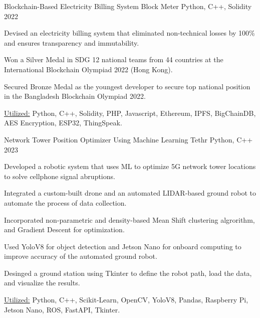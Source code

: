 

\begin{cventries}
      
  \cventryprojects
  {Blockchain-Based Electricity Billing System } %
  {Block Meter} %
  {Python, C++, Solidity} %
  {2022} %
  {
    \begin{cvitems} %
      \item {Devised an electricity billing system that eliminated non-technical losses by 100\% and ensures transparency and immutability.}
      \item {Won a Silver Medal in SDG 12 national teams from 44 countries at the International Blockchain Olympiad 2022 (Hong Kong).}
      \item {Secured Bronze Medal as the youngest developer to secure top national position in the Bangladesh Blockchain Olympiad 2022.}
      \item {\underline{Utilized:} Python, C++, Solidity, PHP, Javascript, Ethereum, IPFS, BigChainDB, AES Encryption, ESP32, ThingSpeak.}
    \end{cvitems}
    }
          
  \cventryprojects
    {Network Tower Position Optimizer Using Machine Learning} %
    {Tethr} %
    {Python, C++} %
    {2023} %
    {
      \begin{cvitems} %
        \item {Developed a robotic system that uses ML to optimize 5G network tower locations 
        to solve cellphone signal abruptions.}
        \item {Integrated a custom-built drone and an automated LIDAR-based ground robot to automate the process of 
        data collection.}
        \item {Incorporated non-parametric and density-based Mean Shift clustering algrorithm, and Gradient Descent 
        for optimization.}
        \item {Used YoloV8 for object detection and Jetson Nano for onboard computing to improve accuracy of the automated 
        ground robot.}
        \item {Desinged a ground station using Tkinter to define the robot path, load the data, and visualize the results.}
        \item {\underline{Utilized:} Python, C++, Scikit-Learn, OpenCV, YoloV8, Pandas, Raspberry Pi, Jetson Nano, ROS, FastAPI, Tkinter.}
      \end{cvitems}
      }
     

\end{cventries}
